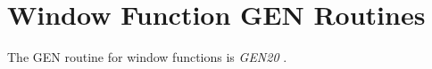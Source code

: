 \begin{comment}
\documentclass[10pt]{article}
\usepackage{fullpage, graphicx, url}
\setlength{\parskip}{1ex}
\setlength{\parindent}{0ex}
\title{Window Function GEN Routines}



\begin{tabular}{ccc}
The Alternative Csound Reference Manual & & \\
Previous &The Standard Numeric Score &Next

\end{tabular}

\end{comment}
\section{Window Function GEN Routines}


  The GEN routine for window functions is \emph{GEN20}
. 


\begin{comment}
\begin{tabular}{lcr}
Previous &Home &Next \\
Numeric Value Access GEN Routines &Up &Random Function GEN Routines

\end{tabular}



\end{comment}
